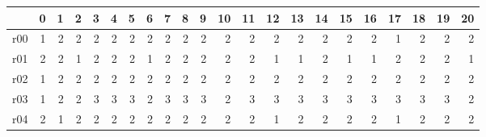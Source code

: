 {\scriptsize
\begin{tabular}{l*{21}{r}} \toprule
& 0& 1& 2& 3& 4& 5& 6& 7& 8& 9& 10& 11& 12& 13& 14& 15& 16& 17& 18& 19& 20\\ \midrule 
r00& \cellcolor{magenta!10} 1& \cellcolor{magenta!10} 2& \cellcolor{magenta!10} 2& \cellcolor{magenta!10} 2& \cellcolor{magenta!10} 2& \cellcolor{magenta!10} 2& \cellcolor{magenta!10} 2& \cellcolor{magenta!10} 2& \cellcolor{magenta!10} 2& \cellcolor{magenta!10} 2& \cellcolor{magenta!10} 2& \cellcolor{magenta!10} 2& \cellcolor{magenta!10} 2& \cellcolor{magenta!10} 2& \cellcolor{magenta!10} 2& \cellcolor{magenta!10} 2& \cellcolor{magenta!10} 2& \cellcolor{magenta!10} 1& \cellcolor{magenta!10} 2& \cellcolor{magenta!10} 2& \cellcolor{magenta!10} 2\\ 
r01& \cellcolor{magenta!10} 2& \cellcolor{magenta!10} 2& \cellcolor{magenta!10} 1& \cellcolor{magenta!10} 2& \cellcolor{magenta!10} 2& \cellcolor{magenta!10} 2& \cellcolor{magenta!10} 1& \cellcolor{magenta!10} 2& \cellcolor{magenta!10} 2& \cellcolor{magenta!10} 2& \cellcolor{magenta!10} 2& \cellcolor{magenta!10} 2& \cellcolor{magenta!10} 1& \cellcolor{magenta!10} 1& \cellcolor{magenta!10} 2& \cellcolor{magenta!10} 1& \cellcolor{magenta!10} 1& \cellcolor{magenta!10} 2& \cellcolor{magenta!10} 2& \cellcolor{magenta!10} 2& \cellcolor{magenta!10} 1\\ 
r02& \cellcolor{magenta!10} 1& \cellcolor{magenta!10} 2& \cellcolor{magenta!10} 2& \cellcolor{magenta!10} 2& \cellcolor{magenta!10} 2& \cellcolor{magenta!10} 2& \cellcolor{magenta!10} 2& \cellcolor{magenta!10} 2& \cellcolor{magenta!10} 2& \cellcolor{magenta!10} 2& \cellcolor{magenta!10} 2& \cellcolor{magenta!10} 2& \cellcolor{magenta!10} 2& \cellcolor{magenta!10} 2& \cellcolor{magenta!10} 2& \cellcolor{magenta!10} 2& \cellcolor{magenta!10} 2& \cellcolor{magenta!10} 2& \cellcolor{magenta!10} 2& \cellcolor{magenta!10} 2& \cellcolor{magenta!10} 2\\ 
r03& \cellcolor{magenta!10} 1& \cellcolor{magenta!10} 2& \cellcolor{magenta!10} 2& \cellcolor{magenta!10} 3& \cellcolor{magenta!10} 3& \cellcolor{magenta!10} 3& \cellcolor{magenta!10} 2& \cellcolor{magenta!10} 3& \cellcolor{magenta!10} 3& \cellcolor{magenta!10} 3& \cellcolor{magenta!10} 2& \cellcolor{magenta!10} 3& \cellcolor{magenta!10} 3& \cellcolor{magenta!10} 3& \cellcolor{magenta!10} 3& \cellcolor{magenta!10} 3& \cellcolor{magenta!10} 3& \cellcolor{magenta!10} 3& \cellcolor{magenta!10} 3& \cellcolor{magenta!10} 3& \cellcolor{magenta!10} 2\\ 
r04& \cellcolor{cyan!10} 2& \cellcolor{cyan!10} 1& \cellcolor{cyan!10} 2& \cellcolor{cyan!10} 2& \cellcolor{cyan!10} 2& \cellcolor{cyan!10} 2& \cellcolor{cyan!10} 2& \cellcolor{cyan!10} 2& \cellcolor{cyan!10} 2& \cellcolor{cyan!10} 2& \cellcolor{cyan!10} 2& \cellcolor{cyan!10} 2& \cellcolor{cyan!10} 1& \cellcolor{cyan!10} 2& \cellcolor{cyan!10} 2& \cellcolor{cyan!10} 2& \cellcolor{cyan!10} 2& \cellcolor{cyan!10} 1& \cellcolor{cyan!10} 2& \cellcolor{cyan!10} 2& \cellcolor{cyan!10} 2\\ 

\end{tabular}}
